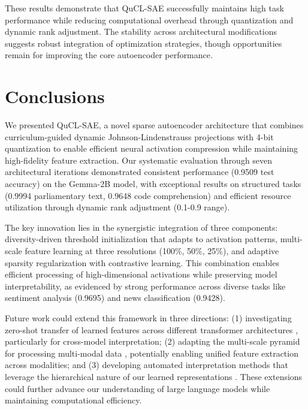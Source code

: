 \documentclass{article} %
\begin{document}
These results demonstrate that QuCL-SAE successfully maintains high task performance while reducing computational overhead through quantization and dynamic rank adjustment. The stability across architectural modifications suggests robust integration of optimization strategies, though opportunities remain for improving the core autoencoder performance.

\section{Conclusions}
\label{sec:conclusion}

We presented QuCL-SAE, a novel sparse autoencoder architecture that combines curriculum-guided dynamic Johnson-Lindenstrauss projections with 4-bit quantization to enable efficient neural activation compression while maintaining high-fidelity feature extraction. Our systematic evaluation through seven architectural iterations demonstrated consistent performance (0.9509 test accuracy) on the Gemma-2B model, with exceptional results on structured tasks (0.9994 parliamentary text, 0.9648 code comprehension) and efficient resource utilization through dynamic rank adjustment (0.1-0.9 range).

The key innovation lies in the synergistic integration of three components: diversity-driven threshold initialization that adapts to activation patterns, multi-scale feature learning at three resolutions (100\%, 50\%, 25\%), and adaptive sparsity regularization with contrastive learning. This combination enables efficient processing of high-dimensional activations while preserving model interpretability, as evidenced by strong performance across diverse tasks like sentiment analysis (0.9695) and news classification (0.9428).

Future work could extend this framework in three directions: (1) investigating zero-shot transfer of learned features across different transformer architectures \cite{vaswani2017attention}, particularly for cross-model interpretation; (2) adapting the multi-scale pyramid for processing multi-modal data \cite{radford2019language}, potentially enabling unified feature extraction across modalities; and (3) developing automated interpretation methods that leverage the hierarchical nature of our learned representations \cite{bahdanau2014neural}. These extensions could further advance our understanding of large language models while maintaining computational efficiency.



\end{document}
